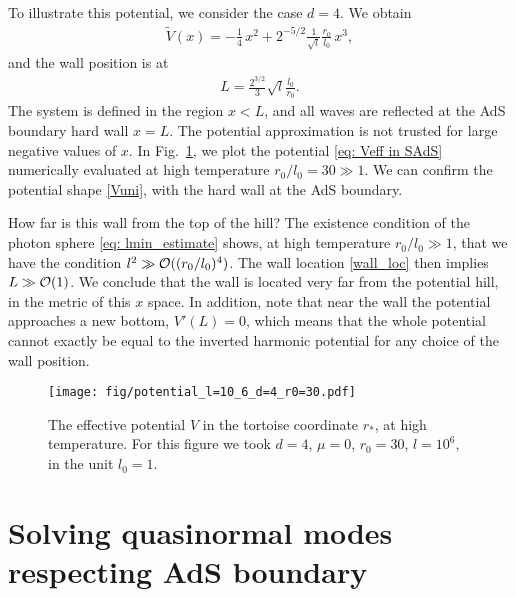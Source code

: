 \documentclass[a4paper,11pt]{article}
\begin{document}
To illustrate this potential, we consider the case $d=4$. We obtain
\begin{align}
    \widetilde{V}(x) = -\frac14 \, x^2 + 2^{-5/2} \frac{1}{\sqrt{l}} \frac{r_0}{l_0} \, x^3 ,
\end{align}
and the wall position is at
\begin{align}
    L = \frac{2^{3/2}}{3} \sqrt{l}\frac{l_0}{r_0} .
    \label{wall_loc}
\end{align}
The system is defined in the region $x<L$, and all waves are reflected at the AdS boundary hard wall $x=L$. The potential approximation is not trusted for large negative values of $x$.
In Fig.~\ref{fig: V in r* at high temperature}, we plot the potential \eqref{eq: Veff in SAdS} numerically evaluated at high temperature $r_0/l_0=30\gg 1$. We can confirm the potential shape \eqref{Vuni}, with the hard wall at the AdS boundary.

How far is this wall from the top of the hill? The existence condition of the photon sphere \eqref{eq: lmin_estimate} shows, at high temperature $r_0/l_0 \gg 1$, that we have the condition $l^2 \gg {\cal O}((r_0/l_0)^4)$. The wall location \eqref{wall_loc} then implies $L\gg {\cal O}(1)$. We conclude that the wall is located very far from the potential hill, in the metric of this $x$ space.
In addition, note that near the wall the potential approaches a new bottom, $V'(L)=0$, which means that
the whole potential cannot exactly be equal to the inverted harmonic potential for any choice of the wall position.



\begin{figure}[t]
    \centering
    \texttt{[image: fig/potential\_l=10\_6\_d=4\_r0=30.pdf]}
    \caption{The effective potential $V$ in the tortoise coordinate $r_*$, at high temperature.
    For this figure we took $d=4$, $\mu=0$, $r_0=30$, $l=10^6$, in the unit $l_0=1$. 
    }
    \label{fig: V in r* at high temperature}
\end{figure}





\section{Solving quasinormal modes respecting AdS boundary}
\label{sec:4}
\end{document}
